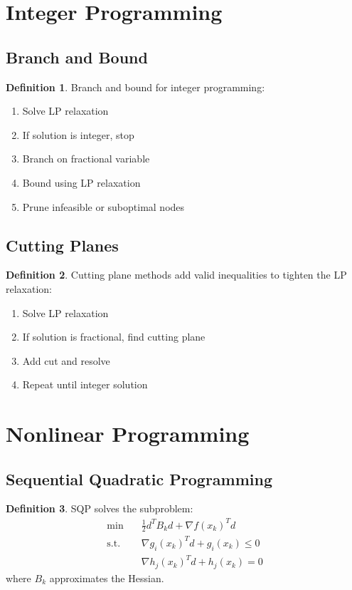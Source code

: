 \documentclass[11pt]{article}
\theoremstyle{definition}
\newtheorem{definition}{Definition}[section]
\begin{document}
\section{Integer Programming}

\subsection{Branch and Bound}
\begin{definition}
Branch and bound for integer programming:
\begin{enumerate}
    \item Solve LP relaxation
    \item If solution is integer, stop
    \item Branch on fractional variable
    \item Bound using LP relaxation
    \item Prune infeasible or suboptimal nodes
\end{enumerate}
\end{definition}

\subsection{Cutting Planes}
\begin{definition}
Cutting plane methods add valid inequalities to tighten the LP relaxation:
\begin{enumerate}
    \item Solve LP relaxation
    \item If solution is fractional, find cutting plane
    \item Add cut and resolve
    \item Repeat until integer solution
\end{enumerate}
\end{definition}

\section{Nonlinear Programming}

\subsection{Sequential Quadratic Programming}
\begin{definition}
SQP solves the subproblem:
\begin{align}
\min \quad & \frac{1}{2} d^T B_k d + \nabla f(x_k)^T d \\
\text{s.t.} \quad & \nabla g_i(x_k)^T d + g_i(x_k) \leq 0 \\
& \nabla h_j(x_k)^T d + h_j(x_k) = 0
\end{align}
where $B_k$ approximates the Hessian.
\end{definition}
\end{document}
